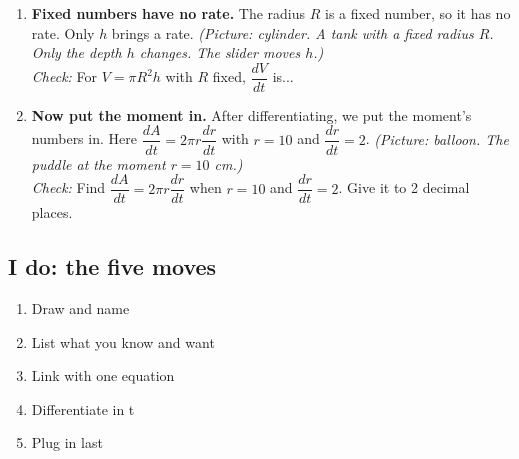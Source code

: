 \documentclass[11pt]{article}
\begin{document}
\begin{enumerate}
\item \textbf{Fixed numbers have no rate.} The radius $R$ is a fixed number, so it has no rate. Only $h$ brings a rate. \textit{(Picture: cylinder. A tank with a fixed radius $R$. Only the depth $h$ changes. The slider moves $h$.)}\\ \textit{Check:} For $V=\pi R^2h$ with $R$ fixed, $\dfrac{dV}{dt}$ is... 
\item \textbf{Now put the moment in.} After differentiating, we put the moment's numbers in. Here $\dfrac{dA}{dt}=2\pi r\dfrac{dr}{dt}$ with $r=10$ and $\dfrac{dr}{dt}=2$. \textit{(Picture: balloon. The puddle at the moment $r=10$ cm.)}\\ \textit{Check:} Find $\dfrac{dA}{dt}=2\pi r\dfrac{dr}{dt}$ when $r=10$ and $\dfrac{dr}{dt}=2$. Give it to 2 decimal places. 
\end{enumerate}
\subsection*{I do: the five moves}\begin{enumerate}\item Draw and name
\item List what you know and want
\item Link with one equation
\item Differentiate in t
\item Plug in last\end{enumerate}
\end{document}
